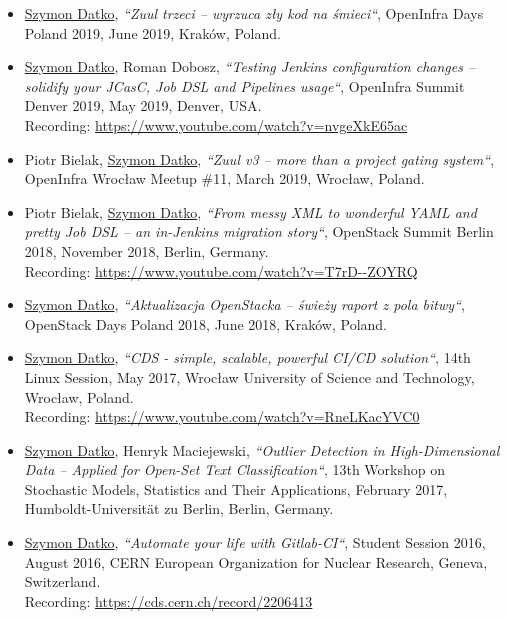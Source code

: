 \begin{itemize}
    \item
        \underline{Szymon Datko},
        \textit{“Zuul trzeci – wyrzuca zły kod na śmieci“},
        OpenInfra Days Poland 2019,
        June 2019, Kraków, Poland.

    \item
        \underline{Szymon Datko}, Roman Dobosz,
        \textit{“Testing Jenkins configuration changes – solidify your JCasC, Job DSL and Pipelines usage“},
        OpenInfra Summit Denver 2019,
        May 2019, Denver, USA.\\
        Recording: \url{https://www.youtube.com/watch?v=nvgeXkE65ac}

    \item
        Piotr Bielak, \underline{Szymon Datko},
        \textit{“Zuul v3 – more than a project gating system“},
        OpenInfra Wrocław Meetup \#11,
        March 2019, Wrocław, Poland.

    \item
        Piotr Bielak, \underline{Szymon Datko},
        \textit{“From messy XML to wonderful YAML and pretty Job DSL – an in-Jenkins migration story“},
        OpenStack Summit Berlin 2018,
        November 2018, Berlin, Germany.\\
        Recording: \url{https://www.youtube.com/watch?v=T7rD--ZOYRQ}

    \item
        \underline{Szymon Datko},
        \textit{“Aktualizacja OpenStacka – świeży raport z pola bitwy“},
        OpenStack Days Poland 2018,
        June 2018, Kraków, Poland.

    \item
        \underline{Szymon Datko},
        \textit{“CDS - simple, scalable, powerful CI/CD solution“},
        14th Linux Session,
        May 2017, Wrocław University of Science and Technology, Wrocław, Poland.\\
        Recording: \url{https://www.youtube.com/watch?v=RneLKacYVC0}

    \item
        \underline{Szymon Datko}, Henryk Maciejewski,
        \textit{“Outlier Detection in High-Dimensional Data – Applied for Open-Set Text Classification“},
        13th Workshop on Stochastic Models, Statistics and Their Applications,
        February 2017, Humboldt-Universität zu Berlin, Berlin, Germany.

    \item
        \underline{Szymon Datko},
        \textit{“Automate your life with Gitlab-CI“},
        Student Session 2016,
        August 2016, CERN European Organization for Nuclear Research, Geneva, Switzerland.\\
        Recording: \url{https://cds.cern.ch/record/2206413}
\end{itemize}



